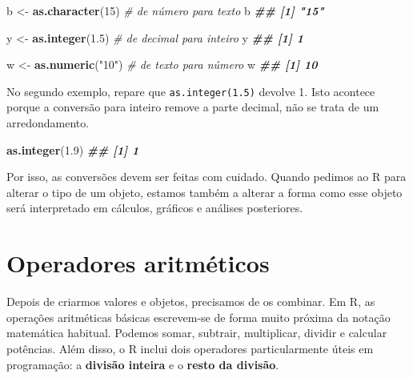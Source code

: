 \documentclass[
  portuguese,
  11pt,
  openany]{book}
\newenvironment{Shaded}{\begin{snugshade}}{\end{snugshade}}
\newcommand{\CommentTok}[1]{\textcolor[rgb]{0.56,0.35,0.01}{\textit{#1}}}
\newcommand{\DecValTok}[1]{\textcolor[rgb]{0.00,0.00,0.81}{#1}}
\newcommand{\DocumentationTok}[1]{\textcolor[rgb]{0.56,0.35,0.01}{\textbf{\textit{#1}}}}
\newcommand{\FloatTok}[1]{\textcolor[rgb]{0.00,0.00,0.81}{#1}}
\newcommand{\FunctionTok}[1]{\textcolor[rgb]{0.13,0.29,0.53}{\textbf{#1}}}
\newcommand{\NormalTok}[1]{#1}
\newcommand{\OtherTok}[1]{\textcolor[rgb]{0.56,0.35,0.01}{#1}}
\newcommand{\StringTok}[1]{\textcolor[rgb]{0.31,0.60,0.02}{#1}}
\begin{document}
\begin{Shaded}
\begin{Highlighting}[]
\NormalTok{b }\OtherTok{\textless{}{-}} \FunctionTok{as.character}\NormalTok{(}\DecValTok{15}\NormalTok{)   }\CommentTok{\# de número para texto}
\NormalTok{b}
\DocumentationTok{\#\# [1] "15"}

\NormalTok{y }\OtherTok{\textless{}{-}} \FunctionTok{as.integer}\NormalTok{(}\FloatTok{1.5}\NormalTok{)    }\CommentTok{\# de decimal para inteiro}
\NormalTok{y}
\DocumentationTok{\#\# [1] 1}

\NormalTok{w }\OtherTok{\textless{}{-}} \FunctionTok{as.numeric}\NormalTok{(}\StringTok{"10"}\NormalTok{)   }\CommentTok{\# de texto para número}
\NormalTok{w}
\DocumentationTok{\#\# [1] 10}
\end{Highlighting}
\end{Shaded}

No segundo exemplo, repare que \texttt{as.integer(1.5)} devolve 1. Isto acontece porque a conversão para inteiro remove a parte decimal, não se trata de um arredondamento.

\begin{Shaded}
\begin{Highlighting}[]
\FunctionTok{as.integer}\NormalTok{(}\FloatTok{1.9}\NormalTok{)}
\DocumentationTok{\#\# [1] 1}
\end{Highlighting}
\end{Shaded}

Por isso, as conversões devem ser feitas com cuidado. Quando pedimos ao R para alterar o tipo de um objeto, estamos também a alterar a forma como esse objeto será interpretado em cálculos, gráficos e análises posteriores.

\section{Operadores aritméticos}\label{operadores-aritmuxe9ticos}

Depois de criarmos valores e objetos, precisamos de os combinar. Em R, as operações aritméticas básicas escrevem-se de forma muito próxima da notação matemática habitual. Podemos somar, subtrair, multiplicar, dividir e calcular potências. Além disso, o R inclui dois operadores particularmente úteis em programação: a \textbf{divisão inteira} e o \textbf{resto da divisão}.
\end{document}
